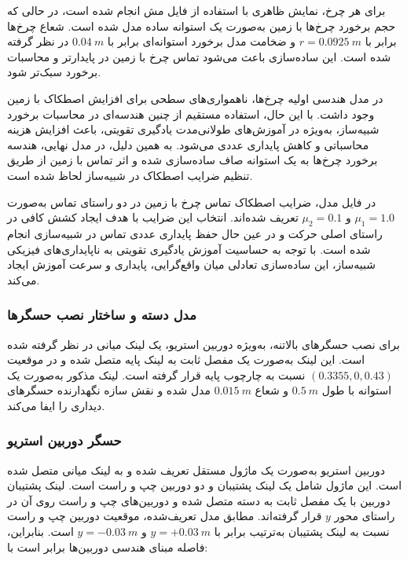 برای هر چرخ، نمایش ظاهری با استفاده از فایل مش انجام شده است، در حالی که حجم برخورد چرخ‌ها با زمین به‌صورت یک استوانه ساده مدل شده است. شعاع چرخ‌ها برابر با \(r=0.0925~m\) و ضخامت مدل برخورد استوانه‌ای برابر با \(0.04~m\) در نظر گرفته شده است. این ساده‌سازی باعث می‌شود تماس چرخ با زمین در  پایدارتر و محاسبات برخورد سبک‌تر شود.

در مدل هندسی اولیه چرخ‌ها، ناهمواری‌های سطحی برای افزایش اصطکاک با زمین وجود داشت. با این حال، استفاده مستقیم از چنین هندسه‌ای در محاسبات برخورد شبیه‌ساز، به‌ویژه در آموزش‌های طولانی‌مدت یادگیری تقویتی، باعث افزایش هزینه محاسباتی و کاهش پایداری عددی می‌شود. به همین دلیل، در مدل نهایی، هندسه برخورد چرخ‌ها به یک استوانه صاف ساده‌سازی شده و اثر تماس با زمین از طریق تنظیم ضرایب اصطکاک در شبیه‌ساز لحاظ شده است.

در فایل مدل، ضرایب اصطکاک تماس چرخ با زمین در دو راستای تماس به‌صورت \(\mu_1=1.0\) و \(\mu_2=0.1\) تعریف شده‌اند. انتخاب این ضرایب با هدف ایجاد کشش کافی در راستای اصلی حرکت و در عین حال حفظ پایداری عددی تماس در شبیه‌سازی انجام شده است. با توجه به حساسیت آموزش یادگیری تقویتی به ناپایداری‌های فیزیکی شبیه‌ساز، این ساده‌سازی تعادلی میان واقع‌گرایی، پایداری و سرعت آموزش ایجاد می‌کند.

\subsubsection{مدل دسته و ساختار نصب حسگرها}
\label{subsubsec:handle_sensor_mount}

برای نصب حسگرهای بالاتنه، به‌ویژه دوربین استریو، یک لینک میانی در نظر گرفته شده است. این لینک به‌صورت یک مفصل ثابت به لینک پایه متصل شده و در موقعیت \((0.3355,0,0.43)\) نسبت به چارچوب پایه قرار گرفته است. لینک مذکور به‌صورت یک استوانه با طول \(0.5~m\) و شعاع \(0.015~m\) مدل شده و نقش سازه نگهدارنده حسگرهای دیداری را ایفا می‌کند.

\subsubsection{حسگر دوربین استریو}
\label{subsubsec:stereo_camera_model}

دوربین استریو به‌صورت یک ماژول مستقل تعریف شده و به لینک میانی متصل شده است. این ماژول شامل یک لینک پشتیبان و دو دوربین چپ و راست است. لینک پشتیبان دوربین با یک مفصل ثابت به دسته متصل شده و دوربین‌های چپ و راست روی آن در راستای محور \(y\) قرار گرفته‌اند. مطابق مدل تعریف‌شده، موقعیت دوربین چپ و راست نسبت به لینک پشتیبان به‌ترتیب برابر با \(y=+0.03~m\) و \(y=-0.03~m\) است. بنابراین، فاصله مبنای هندسی دوربین‌ها برابر است با:

